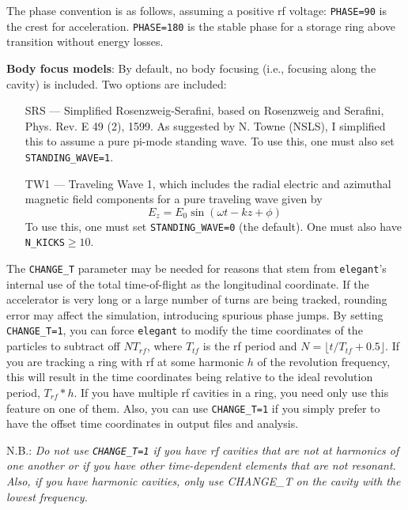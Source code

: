 The phase convention is as follows, assuming a positive rf voltage:
\verb|PHASE=90| is the crest for acceleration.  \verb|PHASE=180| is the stable
phase for a storage ring above transition without energy losses.

{\bf Body focus models}: By default, no body focusing (i.e., focusing along the
cavity) is included. Two options are included:
\begin{itemize}
\item[SRS] --- Simplified Rosenzweig-Serafini, based on Rosenzweig and Serafini, Phys. Rev. E 49 (2),
1599.  As suggested by N. Towne (NSLS), I simplified this to assume a pure pi-mode
standing wave. To use this, one must also set \verb|STANDING_WAVE=1|.
\item[TW1] --- Traveling Wave 1, which includes the radial electric and azimuthal
magnetic field components for a pure traveling wave given by 
\begin{equation}
        E_z = E_0 \sin \left(\omega t - k z + \phi\right)
\end{equation}
To use this, one must set \verb|STANDING_WAVE=0| (the default). One must also have \verb|N_KICKS|$\geq 10$.
\end{itemize}

The \verb|CHANGE_T| parameter may be needed for reasons that stem from
{\tt elegant}'s internal use of the total time-of-flight as the
longitudinal coordinate.  If the accelerator is very long or a large
number of turns are being tracked, rounding error may affect the
simulation, introducing spurious phase jumps.  By setting
\verb|CHANGE_T=1|, you can force {\tt elegant} to modify the time
coordinates of the particles to subtract off $N T_{rf}$, where
$T_{tf}$ is the rf period and $N = \lfloor t/T_{tf}+0.5\rfloor$.  If
you are tracking a ring with rf at some harmonic $h$ of the revolution
frequency, this will result in the time coordinates being relative to
the ideal revolution period, $T_{rf}*h$.  If you have multiple rf
cavities in a ring, you need only use this feature on one of them.
Also, you can use \verb|CHANGE_T=1| if you simply prefer to have the
offset time coordinates in output files and analysis. 

N.B.: {\em Do not use \verb|CHANGE_T=1| if you have rf cavities that
are not at harmonics of one another or if you have other
time-dependent elements that are not resonant. Also, if you have harmonic
cavities, only use CHANGE_T on the cavity with the lowest frequency.}
